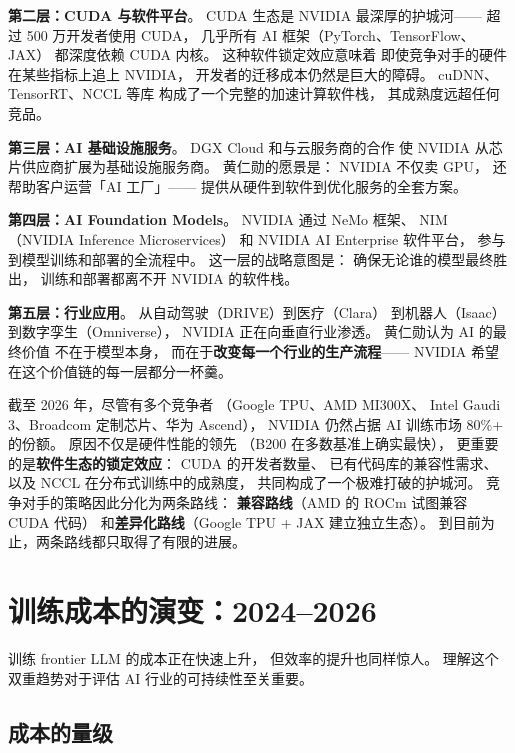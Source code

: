 \textbf{第二层：CUDA 与软件平台}。
CUDA 生态是 NVIDIA 最深厚的护城河——
超过 500 万开发者使用 CUDA，
几乎所有 AI 框架（PyTorch、TensorFlow、JAX）
都深度依赖 CUDA 内核。
这种软件锁定效应意味着
即使竞争对手的硬件在某些指标上追上 NVIDIA，
开发者的迁移成本仍然是巨大的障碍。
cuDNN、TensorRT、NCCL 等库
构成了一个完整的加速计算软件栈，
其成熟度远超任何竞品。

\textbf{第三层：AI 基础设施服务}。
DGX Cloud 和与云服务商的合作
使 NVIDIA 从芯片供应商扩展为基础设施服务商。
黄仁勋的愿景是：
NVIDIA 不仅卖 GPU，
还帮助客户运营「AI 工厂」——
提供从硬件到软件到优化服务的全套方案。

\textbf{第四层：AI Foundation Models}。
NVIDIA 通过 NeMo 框架、
NIM（NVIDIA Inference Microservices）
和 NVIDIA AI Enterprise 软件平台，
参与到模型训练和部署的全流程中。
这一层的战略意图是：
确保无论谁的模型最终胜出，
训练和部署都离不开 NVIDIA 的软件栈。

\textbf{第五层：行业应用}。
从自动驾驶（DRIVE）到医疗（Clara）
到机器人（Isaac）到数字孪生（Omniverse），
NVIDIA 正在向垂直行业渗透。
黄仁勋认为 AI 的最终价值
不在于模型本身，
而在于\textbf{改变每一个行业的生产流程}——
NVIDIA 希望在这个价值链的每一层都分一杯羹。

\begin{whybox}
截至 2026 年，尽管有多个竞争者
（Google TPU、AMD MI300X、
Intel Gaudi 3、Broadcom 定制芯片、华为 Ascend），
NVIDIA 仍然占据 AI 训练市场 80\%+ 的份额。
原因不仅是硬件性能的领先
（B200 在多数基准上确实最快），
更重要的是\textbf{软件生态的锁定效应}：
CUDA 的开发者数量、
已有代码库的兼容性需求、
以及 NCCL 在分布式训练中的成熟度，
共同构成了一个极难打破的护城河。
竞争对手的策略因此分化为两条路线：
\textbf{兼容路线}（AMD 的 ROCm 试图兼容 CUDA 代码）
和\textbf{差异化路线}（Google TPU + JAX 建立独立生态）。
到目前为止，两条路线都只取得了有限的进展。
\end{whybox}

\section{训练成本的演变：2024--2026}
\label{sec:training-cost}

训练 frontier LLM 的成本正在快速上升，
但效率的提升也同样惊人。
理解这个双重趋势对于评估 AI 行业的可持续性至关重要。

\subsection{成本的量级}


